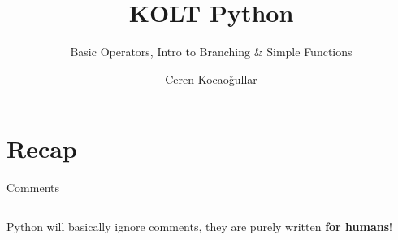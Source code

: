 
\usepackage{../KU-Beamer-Template/style/koc}
\usepackage{minted}
\usepackage{upquote}
\usepackage{graphicx}
\usepackage{tikz}
\usetikzlibrary{shapes.symbols,positioning, chains}


\title{KOLT Python}
\subtitle{Basic Operators, Intro to Branching \& Simple Functions}
\date{}
\author{Ceren Kocaoğullar}


\makeatletter
\let\@@magyar@captionfix\relax
\makeatother

    \maketitle

    \section{Recap}
        \begin{frame}{Comments}
            \LARGE
            \inputminted[frame=single,framesep=2pt]{python3}{code-examples/comments.py}
            Python will basically ignore comments, they are purely written \textbf{for humans}!
        \end{frame}

